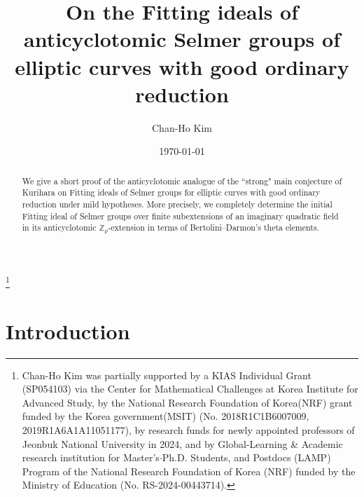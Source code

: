 \documentclass[11pt]{amsart}
\numberwithin{equation}{section}
\theoremstyle{definition}
\begin{document}
\title[Fitting ideals of Selmer groups]{On the Fitting ideals of anticyclotomic Selmer groups of elliptic curves with good ordinary reduction}
\author{Chan-Ho Kim}
\address{
Department of Mathematics and Institute of Pure and Applied Mathematics,
Jeonbuk National University,
567 Baekje-daero, Deokjin-gu, Jeonju, Jeollabuk-do 54896, Republic of Korea
}
\thanks{Chan-Ho Kim was partially supported 
by a KIAS Individual Grant (SP054103) via the Center for Mathematical Challenges at Korea Institute for Advanced Study,
by the National Research Foundation of Korea(NRF) grant funded by the Korea government(MSIT) (No. 2018R1C1B6007009, 2019R1A6A1A11051177), 
by research funds for newly appointed professors of Jeonbuk National University in 2024, and
by Global-Learning \& Academic research institution for Master’s$\cdot$Ph.D. Students, and Postdocs (LAMP) Program of the National Research Foundation of Korea (NRF) funded by the Ministry of Education (No. RS-2024-00443714).
}
\date{\today}
\begin{abstract}
We give a short proof of the anticyclotomic analogue of the ``strong" main conjecture of Kurihara on Fitting ideals of Selmer groups for elliptic curves with good ordinary reduction  under mild hypotheses.
More precisely, we completely determine the initial Fitting ideal of Selmer groups over finite subextensions of an imaginary quadratic field in its anticyclotomic $\mathbb{Z}_p$-extension in terms of Bertolini--Darmon's theta elements.
\end{abstract}
\maketitle

\setcounter{tocdepth}{1}
\section{Introduction}
\end{document}
